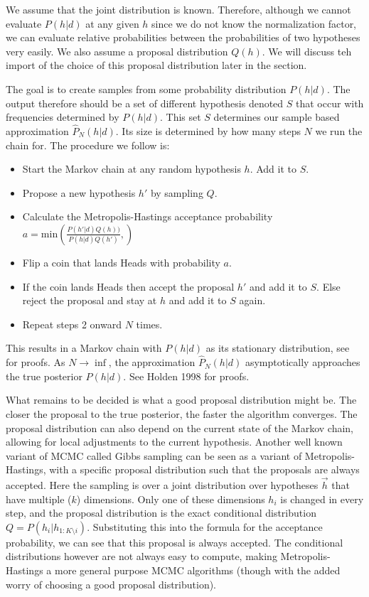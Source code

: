 We assume that the joint distribution is known. Therefore, although we cannot evaluate $P(h | d)$ at any given $h$ since we do not know the normalization factor, we can evaluate relative probabilities between the probabilities of two hypotheses very easily. We also assume a proposal distribution $Q(h)$. We will discuss teh import of the choice of this proposal distribution later in the section. 

The goal is to create samples from some probability distribution $P(h | d)$. The output therefore should be a set of different hypothesis denoted $S$ that occur with frequencies determined by $P(h | d)$. This set $S$ determines our sample based approximation $\hat{P}_N(h|d) $. Its size is determined by how many steps $N$ we run the chain for. The procedure we follow is:
\begin{itemize}
\item Start the Markov chain at any random hypothesis $h$. Add it to $S$.
\item Propose a new hypothesis $h'$ by sampling $Q$.
\item Calculate the Metropolis-Hastings acceptance probability $a = \text{min}\left( \frac{P(h' | d) Q(h))}{P(h | d) Q(h')}, \right)$
\item Flip a coin that lands Heads with probability $a$.
\item If the coin lands Heads then accept the proposal $h'$ and add it to $S$. Else reject the proposal and stay at $h$ and add it to $S$ again.
\item Repeat steps 2 onward $N$ times.
\end{itemize}

This results in a Markov chain with $P(h|d)$ as its stationary distribution, see \citet{blitzstein2014introduction} for proofs. As  $N \rightarrow \inf$, the approximation $\hat{P}_N(h|d) $ asymptotically approaches the true posterior $P(h | d)$. See Holden 1998 \cite{holden1998geometric} for proofs.

What remains to be decided is what a good proposal distribution might be. The closer the proposal to the true posterior, the faster the algorithm converges\cite{holden1998geometric}. The proposal distribution can also depend on the current state of the Markov chain, allowing for local adjustments to the current hypothesis. Another well known variant of MCMC called Gibbs sampling can be seen as a variant of Metropolis-Hastings, with a specific proposal distribution such that the proposals are always accepted. Here the sampling is over a joint distribution over hypotheses $\vec{h}$ that have multiple ($k$) dimensions. Only one of these dimensions $h_i$ is changed in every step, and the proposal distribution is the exact conditional distribution $Q = P(h_i | h_{1:K\setminus i})$. Substituting this into the formula for the acceptance probability, we can see that this proposal is always accepted. The conditional distributions however are not always easy to compute, making Metropolis-Hastings a more general purpose MCMC algorithms (though with the added worry of choosing a good proposal distribution).

